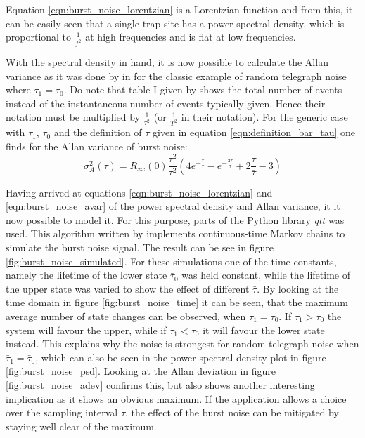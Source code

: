 Equation \ref{eqn:burst_noise_lorentzian} is a Lorentzian function and from this, it can be easily seen that a single trap site has a power spectral density, which is proportional to $\frac{1}{f^2}$ at high frequencies and is flat at low frequencies.

With the spectral density in hand, it is now possible to calculate the Allan variance as it was done by \citeauthor{allen_dev_flicker} in \cite{allen_dev_flicker} for the classic example of random telegraph noise where $\bar \tau_1 = \bar \tau_0$. Do note that table I given by \citeauthor{allen_dev_flicker} shows the total number of events instead of the instantaneous number of events typically given. Hence their notation must be multiplied by $\frac{1}{\tau^2}$ (or $\frac{1}{T^2}$ in their notation). For the generic case with $\bar \tau_1$, $\bar \tau_0$ and the definition of $\bar \tau$ given in equation \ref{eqn:definition_bar_tau} one finds for the Allan variance of burst noise:
\begin{equation}
    \sigma^2_A(\tau) = R_{xx}(0) \frac{\bar \tau^2}{\tau^2} \left(4 e^{-\frac{\tau}{\bar \tau}} - e^{-\frac{2 \tau}{\bar \tau}} + 2 \frac{\tau}{\bar \tau} - 3 \right) \label{eqn:burst_noise_avar}
\end{equation}

Having arrived at equations \ref{eqn:burst_noise_lorentzian} and \ref{eqn:burst_noise_avar} of the power spectral density and Allan variance, it it now possible to model it. For this purpose, parts of the Python library \textit{qtt} \cite{qtt} was used. This algorithm written by \citeauthor{qtt} implements continuous-time Markov chains to simulate the burst noise signal. The result can be see in figure \ref{fig:burst_noise_simulated}. For these simulations one of the time constants, namely the lifetime of the lower state $\bar \tau_0$ was held constant, while the lifetime of the upper state was varied to show the effect of different $\bar \tau$. By looking at the time domain in figure \ref{fig:burst_noise_time} it can be seen, that the maximum average number of state changes can be observed, when $\bar \tau_1 = \bar \tau_0$. If $\bar \tau_1 > \bar \tau_0$ the system will favour the upper, while if $\bar \tau_1 < \bar \tau_0$ it will favour the lower state instead. This explains why the noise is strongest for random telegraph noise when $\bar \tau_1 = \bar \tau_0$, which can also be seen in the power spectral density plot in figure \ref{fig:burst_noise_psd}. Looking at the Allan deviation in figure \ref{fig:burst_noise_adev} confirms this, but also shows another interesting implication as it shows an obvious maximum. If the application allows a choice over the sampling interval $\tau$, the effect of the burst noise can be mitigated by staying well clear of the maximum.

